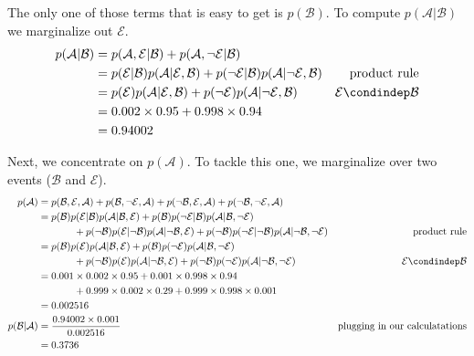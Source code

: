 \documentclass[assignment02_Solutions]{subfiles}
\begin{document}
\begin{exercise}[(60 minutes)]
\begin{boxedsolution}
The only one of those terms that is easy to get is $p(\mathcal{B})$.  To compute $p(\mathcal{A} | \mathcal{B})$ we marginalize out $\mathcal{E}$.
\begin{align}
p(\mathcal{A} | \mathcal{B}) &= p(\mathcal{A}, \mathcal{E} | \mathcal{B}) + p(\mathcal{A}, \neg \mathcal{E} | \mathcal{B}) \nonumber \\
&= p(\mathcal{E} | \mathcal{B}) p(\mathcal{A} | \mathcal{E}, \mathcal{B}) + p(\neg \mathcal{E} | \mathcal{B}) p(\mathcal{A} | \neg \mathcal{E}, \mathcal{B}) & \mbox{product rule} \nonumber \\
&=  p(\mathcal{E}) p(\mathcal{A} | \mathcal{E}, \mathcal{B}) + p(\neg \mathcal{E}) p(\mathcal{A} | \neg \mathcal{E}, \mathcal{B})  &  \mathcal{E} \condindep \mathcal{B} \nonumber \\
&= 0.002 \times 0.95 + 0.998 \times 0.94 \nonumber \\
&= 0.94002 \nonumber
\end{align}

Next, we concentrate on $p(\mathcal{A})$.  To tackle this one, we marginalize over two events ($\mathcal{B}$ and $\mathcal{E}$).
\begin{align}
p(\mathcal{A}) &= p(\mathcal{B}, \mathcal{E}, \mathcal{A}) +  p(\mathcal{B}, \neg \mathcal{E}, \mathcal{A}) + p(\neg \mathcal{B}, \mathcal{E}, \mathcal{A}) + p(\neg \mathcal{B}, \neg \mathcal{E}, \mathcal{A}) \nonumber \\
&= p(\mathcal{B}) p(\mathcal{E} | \mathcal{B}) p(\mathcal{A} | \mathcal{B}, \mathcal{E}) +   p(\mathcal{B}) p(\neg \mathcal{E} | \mathcal{B}) p(\mathcal{A} | \mathcal{B}, \neg \mathcal{E}) \nonumber \\
 &\hspace{0.5in} + p(\neg \mathcal{B}) p(\mathcal{E} | \neg \mathcal{B}) p(\mathcal{A} | \neg \mathcal{B}, \mathcal{E}) +  p(\neg \mathcal{B}) p(\neg \mathcal{E} | \neg \mathcal{B}) p(\mathcal{A} | \neg \mathcal{B}, \neg \mathcal{E}) &\mbox{product rule} \nonumber \\
 &= p(\mathcal{B}) p(\mathcal{E}) p(\mathcal{A} | \mathcal{B}, \mathcal{E}) +   p(\mathcal{B}) p(\neg \mathcal{E}) p(\mathcal{A} | \mathcal{B}, \neg \mathcal{E})  \nonumber \\
 &\hspace{0.5in} + p(\neg \mathcal{B}) p(\mathcal{E}) p(\mathcal{A} | \neg \mathcal{B}, \mathcal{E}) +  p(\neg \mathcal{B}) p(\neg \mathcal{E}) p(\mathcal{A} | \neg \mathcal{B}, \neg \mathcal{E})  & \mathcal{E} \condindep \mathcal{B}  \nonumber \\
 &= 0.001 \times 0.002 \times 0.95 + 0.001 \times 0.998 \times 0.94 \nonumber \\
 &\hspace{0.5in} + 0.999 \times 0.002 \times 0.29 + 0.999 \times 0.998 \times 0.001 \nonumber \\
 &= 0.002516 \nonumber \\
p(\mathcal{B} | \mathcal{A}) &= \frac{0.94002 \times 0.001}{0.002516} & \mbox{plugging in our calculatations} \nonumber \\
&= 0.3736 \nonumber
\end{align}
\end{boxedsolution}


\end{exercise}
\end{document}
